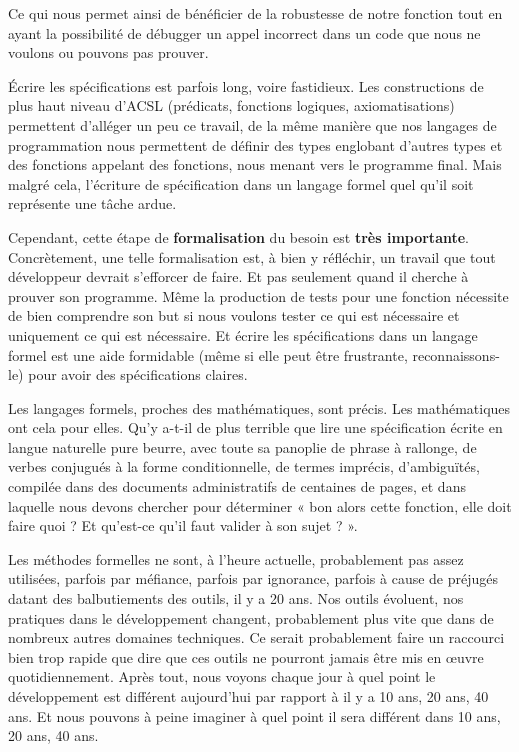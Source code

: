 Ce qui nous permet ainsi de bénéficier de la robustesse de notre fonction tout en
ayant la possibilité de débugger un appel incorrect dans un code que nous ne
voulons ou pouvons pas prouver.



Écrire les spécifications est parfois long, voire fastidieux. Les constructions
de plus haut niveau d'ACSL (prédicats, fonctions logiques, axiomatisations)
permettent d'alléger un peu ce travail, de la même manière que nos langages de
programmation nous permettent de définir des types englobant d'autres types et
des fonctions appelant des fonctions, nous menant vers le programme final. Mais
malgré cela, l'écriture de spécification dans un langage formel quel qu'il soit
représente une tâche ardue.



Cependant, cette étape de \textbf{formalisation} du besoin est \textbf{très importante}.
Concrètement, une telle formalisation est, à bien y réfléchir, un travail que
tout développeur devrait s'efforcer de faire. Et pas seulement quand il cherche
à prouver son programme. Même la production de tests pour une fonction
nécessite de bien comprendre son but si nous voulons tester ce qui est nécessaire
et uniquement ce qui est nécessaire. Et écrire les spécifications dans un
langage formel est une aide formidable (même si elle peut être frustrante,
reconnaissons-le) pour avoir des spécifications claires.



Les langages formels, proches des mathématiques, sont précis. Les mathématiques
ont cela pour elles. Qu'y a-t-il de plus terrible que lire une spécification
écrite en langue naturelle pure beurre, avec toute sa panoplie de phrase à
rallonge, de verbes conjugués à la forme conditionnelle, de termes imprécis,
d'ambiguïtés, compilée dans des documents administratifs de centaines de pages,
et dans laquelle nous devons chercher pour déterminer « bon alors cette fonction,
elle doit faire quoi ? Et qu'est-ce qu'il faut valider à son sujet ? ».



Les méthodes formelles ne sont, à l'heure actuelle, probablement pas assez
utilisées, parfois par méfiance, parfois par ignorance, parfois à cause de
préjugés datant des balbutiements des outils, il y a 20 ans. Nos outils
évoluent, nos pratiques dans le développement changent, probablement plus
vite que dans de nombreux autres domaines techniques. Ce serait probablement
faire un raccourci bien trop rapide que dire que ces outils ne pourront
jamais être mis en œuvre quotidiennement. Après tout, nous voyons chaque jour
à quel point le développement est différent aujourd'hui par rapport à il y a
10 ans, 20 ans, 40 ans. Et nous pouvons à peine imaginer à quel point il sera
différent dans 10 ans, 20 ans, 40 ans.



